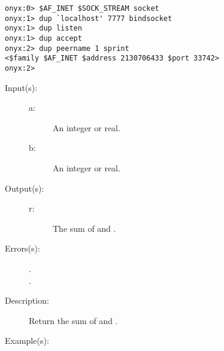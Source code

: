 \begin{description}
\begin{description}
\begin{verbatim}
onyx:0> $AF_INET $SOCK_STREAM socket
onyx:1> dup `localhost' 7777 bindsocket
onyx:1> dup listen
onyx:1> dup accept
onyx:2> dup peername 1 sprint
<$family $AF_INET $address 2130706433 $port 33742>
onyx:2>
		\end{verbatim}
	\end{description}
\label{systemdict:add}
\item[{\onyxop{a b}{add}{r}}: ]
	\begin{description}\item[]
	\item[Input(s): ]
		\begin{description}\item[]
		\item[a: ]
			An integer or real.
		\item[b: ]
			An integer or real.
		\end{description}
	\item[Output(s): ]
		\begin{description}\item[]
		\item[r: ]
			The sum of  and .
		\end{description}
	\item[Errors(s): ]
		\begin{description}\item[]
		\item[.]
		\item[.]
		\end{description}
	\item[Description: ]
		Return the sum of  and .
	\item[Example(s): ]\begin{verbatim}


\end{verbatim}
\end{description}
\end{description}
